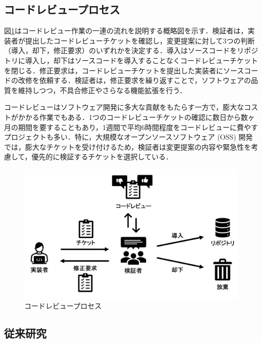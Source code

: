 \documentclass[T,J]{fose} %
\newcommand{\change}[1]{\colorbox{green}{{\bf CHANGE}:}{\color{black} {\textbf{[#1]}}}}
\begin{document}
\subsection{コードレビュープロセス}
図\ref{fig:codereviewprocess}はコードレビュー作業の一連の流れを説明する概略図を示す．検証者は，実装者が提出したコードレビューチケットを確認し，変更提案に対して3つの判断（導入，却下，修正要求）のいずれかを決定する．導入はソースコードをリポジトリに導入し，却下はソースコードを導入することなくコードレビューチケットを閉じる．修正要求は，コードレビューチケットを提出した実装者にソースコードの改修を依頼する．検証者は，修正要求を繰り返すことで，ソフトウェアの品質を維持しつつ，不具合修正やさらなる機能拡張を行う．

コードレビューはソフトウェア開発に多大な貢献をもたらす一方で，膨大なコストがかかる作業でもある．1つのコードレビューチケットの確認に数日から数ヶ月の期間を要することもあり，1週間で平均6時間程度をコードレビューに費やすプロジェクトも多い\cite{review2}．特に，大規模なオープンソースソフトウェア (OSS) 開発では，膨大なチケットを受け付けるため，検証者は変更提案の内容や緊急性を考慮して，優先的に検証するチケットを選択している\cite{integrator}．

\begin{figure}[t]
\begin{center}
\includegraphics[width=1.0\linewidth]{Uenaka_fig/code_review_process.pdf}
\caption{コードレビュープロセス}
\label{fig:codereviewprocess}
\end{center}
\end{figure}

\subsection{従来研究}
\end{document}
